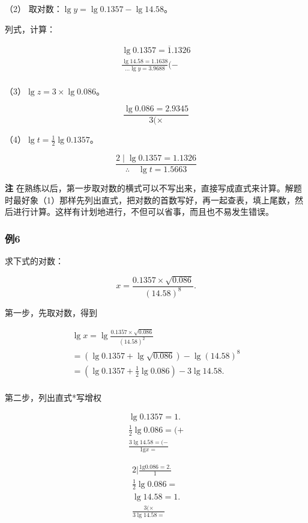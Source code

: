 （2） 取对数：\(\lg y = \lg 0.1357 - \lg 14.58\)。

列式，计算：

\[
\begin{array}{l} \lg 0.1357 = \overline {{1}}. 1326 \\ \frac{\lg 14.58 = 1.1638}{... \lg y = 3.9688} (- \\ \end{array}
\]

（3）\(\lg z = 3 \times \lg 0.086\)。

\[
\frac{\lg 0.086 = 2.9345}{3 (\times}
\]

（4）\(\lg t = \frac{1}{2} \lg 0.1357\)。

\[
\frac{2 \mid \lg 0.1357 = 1.1326}{\therefore \quad \lg t = 1.5663}
\]

\textbf{注}
在熟练以后，第一步取对数的横式可以不写出来，直接写成直式来计算。解题时最好象（1）那样先列出直式，把对数的首数写好，再一起查表，填上尾数，然后进行计算。这样有计划地进行，不但可以省事，而且也不易发生错误。

\subsubsection{例6}

求下式的对数：

\[
x = \frac{0.1357 \times \sqrt{0.086}}{(14.58)^{8}}.
\]

 第一步，先取对数，得到

\[
\begin{array}{l} \lg x = \lg \frac{0.1357 \times \sqrt{0.086}}{(14.58)^{2}} \\ = (\lg 0.1357 + \lg \sqrt{0.086}) - \lg (14.58)^{8} \\ = \left(\lg 0.1357 + \frac{1}{2} \lg 0.086\right) - 3 \lg 14.58. \\ \end{array}
\]

第二步，列出直式*写增权

\[
\begin{array}{l} \lg 0.1357 = 1. \\ \frac{1}{2} \lg 0.086 = (+ \\ \frac{3 \lg 14.58 = (-}{1 \mathrm{g} x =} \end{array}
\]

\[
\begin{array}{l} 2 \vert \frac{1 \mathrm{g} 0.086 = 2.}{1} \\ \frac{1}{2} \lg 0.086 = \\ \lg 14.58 = 1. \\ \frac{3 (\times}{3 \lg 14.58 =} \\ \end{array}
\]

